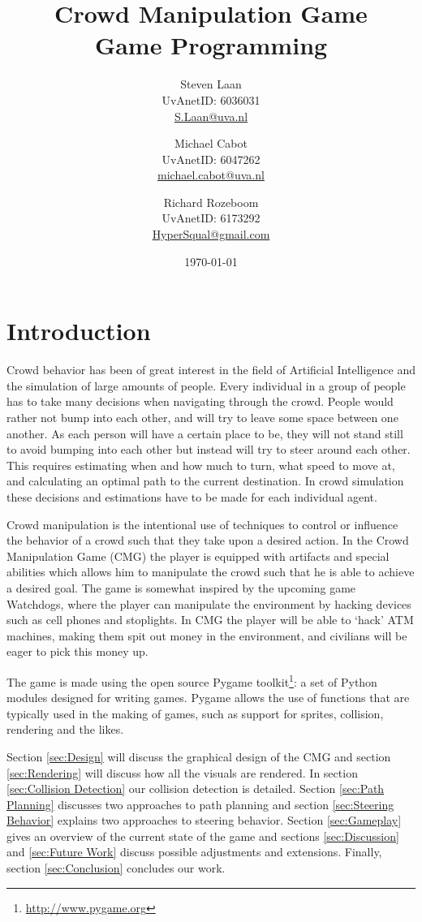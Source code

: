 \documentclass[a4paper,pdf,12pt]{article}
\title{Crowd Manipulation Game\\ \normalsize{Game Programming}}
\author{Steven Laan\\UvAnetID: 6036031\\\url{S.Laan@uva.nl} \and Michael Cabot\\UvAnetID: 6047262\\\url{michael.cabot@uva.nl} \and Richard Rozeboom\\UvAnetID: 6173292\\\url{HyperSqual@gmail.com}}
\date{\today}
\begin{document}
\maketitle

\section{Introduction}
Crowd behavior has been of great interest in the field of Artificial Intelligence and the simulation of large amounts of people. Every individual in a group of people has to take  many decisions when navigating through the crowd. People would rather not bump into each other, and will try to leave some space between one another. As each person will have a certain place to be, they will not stand still to avoid bumping into each other but instead will try to steer around each other. This requires estimating when and how much to turn, what speed to move at, and calculating an optimal path to the current destination. In crowd simulation these decisions and estimations have to be made for each individual agent.

Crowd manipulation is the intentional use of techniques to control or influence the behavior of a crowd such that they take upon a desired action. In the Crowd Manipulation Game (CMG) the player is equipped with artifacts and special abilities which allows him to manipulate the crowd such that he is able to achieve a desired goal. The game is somewhat inspired by the upcoming game Watchdogs\citep{watchdogs}, where the player can manipulate the environment by hacking devices such as cell phones and stoplights. In CMG the player will be able to `hack' ATM machines, making them spit out money in the environment, and civilians will be eager to pick this money up.

The game is made using the open source Pygame toolkit\footnote{\url{http://www.pygame.org}}: a set of Python modules designed for writing games. Pygame allows the use of functions that are typically used in the making of games, such as support for sprites, collision, rendering and the likes. 

Section \ref{sec:Design} will discuss the graphical design of the CMG and section \ref{sec:Rendering} will discuss how all the visuals are rendered. In section \ref{sec:Collision Detection} our collision detection is detailed. Section \ref{sec:Path Planning} discusses two approaches to path planning and section \ref{sec:Steering Behavior} explains two approaches to steering behavior. Section \ref{sec:Gameplay} gives an overview of the current state of the game and sections \ref{sec:Discussion} and \ref{sec:Future Work} discuss possible adjustments and extensions. Finally, section \ref{sec:Conclusion} concludes our work.
\end{document}
